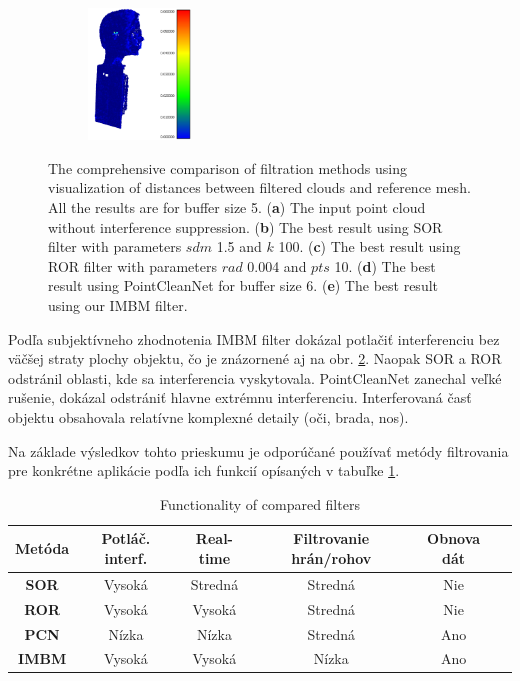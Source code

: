 \begin{figure}[H]
\begin{subfigure}[b]{0.19\textwidth}
		\centering
		\includegraphics[height=3.5cm]{figures/imbm_best.png}
		\caption{}
		\label{fig:best:e}
	\end{subfigure}
	\caption{The comprehensive comparison of filtration methods using visualization of distances between filtered clouds and reference mesh. All the results are for buffer size 5. (\textbf{a}) The input point cloud without interference suppression. (\textbf{b}) The best result using SOR filter with parameters $sdm$ 1.5 and $k$ 100. (\textbf{c}) The best result using ROR filter with parameters $rad$ 0.004 and $pts$ 10. (\textbf{d}) The best result using PointCleanNet for buffer size 6. (\textbf{e}) The best result using our IMBM filter.}
	\label{fig:best}
\end{figure}

Podľa subjektívneho zhodnotenia IMBM filter dokázal potlačiť interferenciu bez väčšej straty plochy objektu, čo je znázornené aj na obr. \ref{fig:best}. Naopak SOR a ROR odstránil oblasti, kde sa interferencia vyskytovala. PointCleanNet zanechal veľké rušenie, dokázal odstrániť hlavne extrémnu interferenciu. Interferovaná časť objektu obsahovala relatívne komplexné detaily (oči, brada, nos).

Na základe výsledkov tohto prieskumu je odporúčané používať metódy filtrovania pre konkrétne aplikácie podľa ich funkcií opísaných v tabuľke \ref{tab:functionality}.

\begin{table}[h]
	\caption{\label{tab:functionality} Functionality of compared filters }
	\centering
	\begin{tabular}{cccccc}
		\toprule
		\textbf{Metóda} & \textbf{Potláč. interf.} & \textbf{Real-time} & \textbf{Filtrovanie hrán/rohov} & \textbf{Obnova dát} \\ 
		\midrule
		\textbf{SOR}     & Vysoká      & Stredná    & Stredná   & Nie    \\ 
		\textbf{ROR}     & Vysoká      & Vysoká      & Stredná   & Nie    \\ 
		\textbf{PCN}     & Nízka       & Nízka       & Stredná   & Ano   	\\ 
		\textbf{IMBM}    & Vysoká      & Vysoká      & Nízka      & Ano   \\ 
		\bottomrule
	\end{tabular}
\end{table}

